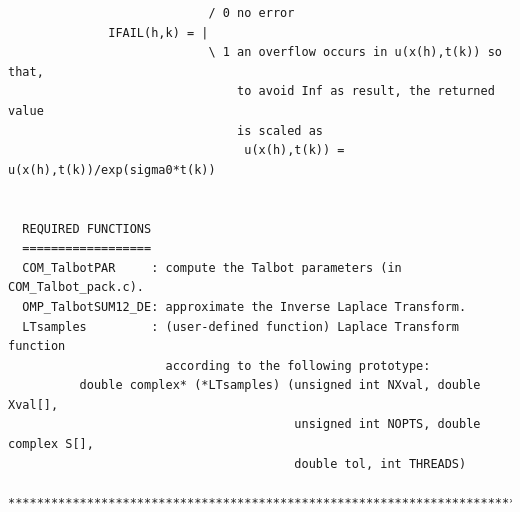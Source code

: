 \documentclass[a4paper,10pt]{report}%
\begin{document}
\begin{lstlisting}
                            / 0 no error
              IFAIL(h,k) = |
                            \ 1 an overflow occurs in u(x(h),t(k)) so that,
                                to avoid Inf as result, the returned value
                                is scaled as
                                 u(x(h),t(k)) = u(x(h),t(k))/exp(sigma0*t(k))


  REQUIRED FUNCTIONS
  ==================
  COM_TalbotPAR     : compute the Talbot parameters (in COM_Talbot_pack.c).
  OMP_TalbotSUM12_DE: approximate the Inverse Laplace Transform.
  LTsamples         : (user-defined function) Laplace Transform function
                      according to the following prototype:
          double complex* (*LTsamples) (unsigned int NXval, double Xval[],
                                        unsigned int NOPTS, double complex S[],
                                        double tol, int THREADS)

*****************************************************************************\
\end{lstlisting}
\end{document}
